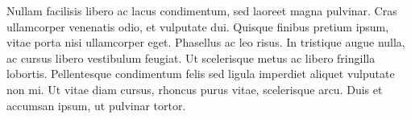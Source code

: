 Nullam facilisis libero ac lacus condimentum, sed laoreet magna pulvinar. Cras ullamcorper venenatis odio, et vulputate dui. Quisque finibus pretium ipsum, vitae porta nisi ullamcorper eget. Phasellus ac leo risus. In tristique augue nulla, ac cursus libero vestibulum feugiat. Ut scelerisque metus ac libero fringilla lobortis. Pellentesque condimentum felis sed ligula imperdiet aliquet vulputate non mi. Ut vitae diam cursus, rhoncus purus vitae, scelerisque arcu. Duis et accumsan ipsum, ut pulvinar tortor.